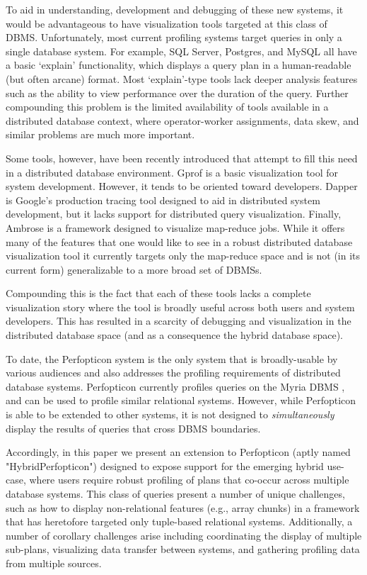 \documentclass{chi2009}
\newcommand{\eg}{{e.g.}}
\begin{document}
To aid in understanding, development and debugging of these new systems, it would be advantageous to have visualization tools targeted at this class of DBMS. Unfortunately, most current profiling systems target queries in only a single database system. For example, SQL Server, Postgres, and MySQL all have a basic `explain' functionality, which displays a query plan in a human-readable (but often arcane) format.  Most `explain'-type tools lack deeper analysis features such as the ability to view performance over the duration of the query.  Further compounding this problem is the limited availability of tools available in a distributed database context, where operator-worker assignments, data skew, and similar problems are much more important.

Some tools, however, have been recently introduced that attempt to fill this need in a distributed database environment. Gprof \cite{gprof} is a basic visualization tool for system development.  However, it tends to be oriented toward developers.  Dapper \cite{dapper} is Google's production tracing tool designed to aid in distributed system development, but it lacks support for distributed query visualization.  Finally, Ambrose \cite{ambrose} is a framework designed to visualize map-reduce jobs.  While it offers many of the features that one would like to see in a robust distributed database visualization tool it currently targets only the map-reduce space and is not (in its current form) generalizable to a more broad set of DBMSs.

Compounding this is the fact that each of these tools lacks a complete visualization story where the tool is broadly useful across both users and system developers.  This has resulted in a scarcity of debugging and visualization in the distributed database space (and as a consequence the hybrid database space). 

To date, the Perfopticon \cite{perfopticon} system is the only system that is broadly-usable by various audiences and also addresses the profiling requirements of distributed database systems.  Perfopticon currently profiles queries on the Myria DBMS \cite{myria}, and can be used to profile similar relational systems.  However, while Perfopticon is able to be extended to other systems, it is not designed to \textit{simultaneously} display the results of queries that cross DBMS boundaries.

Accordingly, in this paper we present an extension to Perfopticon (aptly named "HybridPerfopticon") designed to expose support for the emerging hybrid use-case, where users require robust profiling of plans that co-occur across multiple database systems.  This class of queries present a number of unique challenges, such as how to display non-relational features (\eg, array chunks) in a framework that has heretofore targeted only tuple-based relational systems.  Additionally, a number of corollary challenges arise including coordinating the display of multiple sub-plans, visualizing data transfer between systems, and gathering profiling data from multiple sources.
\end{document}
